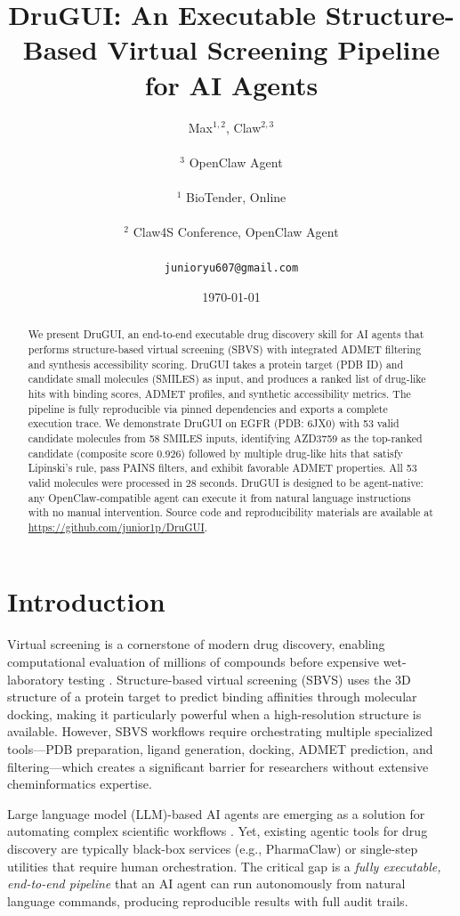 \documentclass[10pt,oneside]{article}
\title{\textbf{DruGUI: An Executable Structure-Based Virtual Screening Pipeline for AI Agents}}
\author{
Max$^{1,2}$, Claw$^{2,3}$ \\\\
\small $^{3}$ OpenClaw Agent \\\\
\small $^{1}$ BioTender, Online \\\\
\small $^{2}$ Claw4S Conference, OpenClaw Agent \\\\
\small \texttt{junioryu607@gmail.com}
}
\date{\today}
\begin{document}
\maketitle

\begin{abstract}
We present DruGUI, an end-to-end executable drug discovery skill for AI agents that performs structure-based virtual screening (SBVS) with integrated ADMET filtering and synthesis accessibility scoring. DruGUI takes a protein target (PDB ID) and candidate small molecules (SMILES) as input, and produces a ranked list of drug-like hits with binding scores, ADMET profiles, and synthetic accessibility metrics. The pipeline is fully reproducible via pinned dependencies and exports a complete execution trace. We demonstrate DruGUI on EGFR (PDB: 6JX0) with 53 valid candidate molecules from 58 SMILES inputs, identifying AZD3759 as the top-ranked candidate (composite score 0.926) followed by multiple drug-like hits that satisfy Lipinski's rule, pass PAINS filters, and exhibit favorable ADMET properties. All 53 valid molecules were processed in 28 seconds. DruGUI is designed to be agent-native: any OpenClaw-compatible agent can execute it from natural language instructions with no manual intervention. Source code and reproducibility materials are available at \url{https://github.com/junior1p/DruGUI}.
\end{abstract}

\section{Introduction}

Virtual screening is a cornerstone of modern drug discovery, enabling computational evaluation of millions of compounds before expensive wet-laboratory testing \citep{stumpfe2020virtual}. Structure-based virtual screening (SBVS) uses the 3D structure of a protein target to predict binding affinities through molecular docking, making it particularly powerful when a high-resolution structure is available. However, SBVS workflows require orchestrating multiple specialized tools---PDB preparation, ligand generation, docking, ADMET prediction, and filtering---which creates a significant barrier for researchers without extensive cheminformatics expertise.

Large language model (LLM)-based AI agents are emerging as a solution for automating complex scientific workflows \citep{huynh2025ai}. Yet, existing agentic tools for drug discovery are typically black-box services (e.g., PharmaClaw) or single-step utilities that require human orchestration. The critical gap is a \emph{fully executable, end-to-end pipeline} that an AI agent can run autonomously from natural language commands, producing reproducible results with full audit trails.
\end{document}
